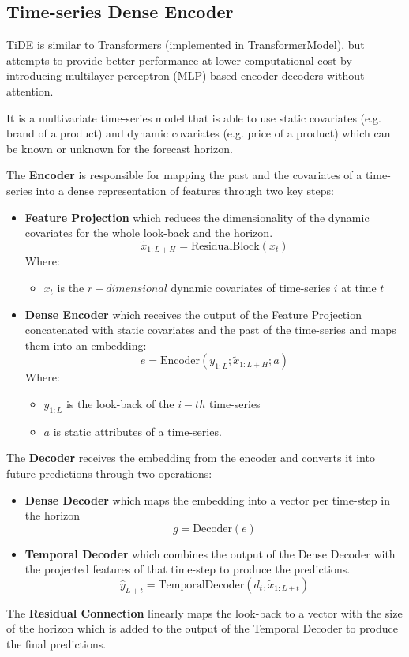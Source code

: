 \documentclass{ieeeojies}
\begin{document}
\subsection{Time-series Dense Encoder}
TiDE is similar to Transformers (implemented in TransformerModel), but attempts to provide better performance at lower computational cost by introducing multilayer perceptron (MLP)-based encoder-decoders without attention.

It is a multivariate time-series model that is able to use static covariates (e.g. brand of a product) and dynamic covariates (e.g. price of a product) which can be known or unknown for the forecast horizon.

The \textbf{Encoder} is responsible for mapping the past and the covariates of a time-series into a dense representation of features through two key steps:
\begin{itemize}
    \item \textbf{Feature Projection} which reduces the dimensionality of the dynamic covariates for the whole look-back and the horizon.
    \[
        \mathit{\tilde{x}_{1:L+H}} = \text{ResidualBlock}(x_t)
    \]
    Where:
    \begin{itemize}
        \item \( x_t \) is the \(r-dimensional\) dynamic covariates of time-series \(i\) at time \(t\)
    \end{itemize}
    \item \textbf{Dense Encoder} which receives the output of the Feature Projection concatenated with static covariates and the past of the time-series and maps them into an embedding:   
    \[
        \mathit{e} = \text{Encoder}(y_{1:L}; \tilde{x}_{1:L+H}; a)
    \]
    Where:
    \begin{itemize}
        \item \( y_{1:L} \) is the look-back of the \(i-th\) time-series
        \item\( a \) is static attributes of a time-series.
    \end{itemize}
    
\end{itemize}

The \textbf{Decoder} receives the embedding from the encoder and converts it into future predictions through two operations:
\begin{itemize}
    \item \textbf{Dense Decoder} which maps the embedding into a vector per time-step in the horizon
    \[
        \mathit{g} = \text{Decoder}(e)
    \]
    \item \textbf{Temporal Decoder} which combines the output of the Dense Decoder with the projected features of that time-step to produce the predictions.
    \[
        \mathit{\hat{y}_{L+t}} = \text{TemporalDecoder}(d_t, \tilde{x}_{1:L+t})
    \]
\end{itemize}
The \textbf{Residual Connection} linearly maps the look-back to a vector with the size of the horizon which is added to the output of the Temporal Decoder to produce the final predictions.
\end{document}
